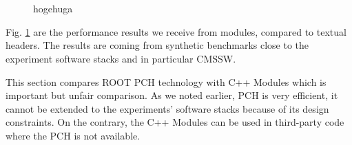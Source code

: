 \documentclass{webofc}
\begin{document}
\begin{figure}
    \begin{minipage}{.48\textwidth}
 　 \end{minipage}\hfill
    \begin{minipage}{.48\textwidth}
 　 \end{minipage}
\caption{hogehuga}
\label{fig:performance}
\end{figure}

Fig. \ref{fig:performance} are the performance results we receive from modules, compared to textual headers.
The results are coming from synthetic benchmarks close to the experiment software stacks and in particular CMSSW.

This section compares ROOT PCH technology with C++ Modules which is important but unfair comparison. As we noted earlier, PCH is very efficient, it cannot be extended to the experiments’ software stacks because of its design constraints. On the contrary, the C++ Modules can be used in third-party code where the PCH is not available.
\end{document}
